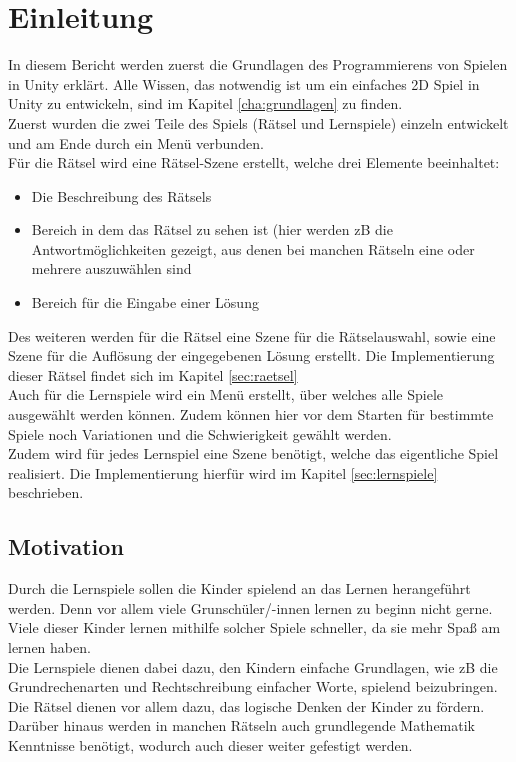 \chapter{Einleitung}
\label{cha:einleitung}

In diesem Bericht werden zuerst die Grundlagen des Programmierens von Spielen in Unity erklärt. Alle Wissen, das notwendig ist um ein einfaches 2D Spiel in Unity zu entwickeln, sind im Kapitel \ref{cha:grundlagen} zu finden.\\
Zuerst wurden die zwei Teile des Spiels (Rätsel und Lernspiele) einzeln entwickelt und am Ende durch ein Menü verbunden.\\
Für die Rätsel wird eine Rätsel-Szene erstellt, welche drei Elemente beeinhaltet:
\begin{itemize}
	\item Die Beschreibung des Rätsels
	\item Bereich in dem das Rätsel zu sehen ist (hier werden zB die Antwortmöglichkeiten gezeigt, aus denen bei manchen Rätseln eine oder mehrere auszuwählen sind %
	\item Bereich für die Eingabe einer Lösung
\end{itemize}
Des weiteren werden für die Rätsel eine Szene für die Rätselauswahl, sowie eine Szene für die Auflösung der eingegebenen Lösung erstellt. Die Implementierung dieser Rätsel findet sich im Kapitel \ref{sec:raetsel}\\

Auch für die Lernspiele wird ein Menü erstellt, über welches alle Spiele ausgewählt werden können. Zudem können hier vor dem Starten für bestimmte Spiele noch Variationen und die Schwierigkeit gewählt werden. \\
Zudem wird für jedes Lernspiel eine Szene benötigt, welche das eigentliche Spiel realisiert. Die Implementierung hierfür wird im Kapitel \ref{sec:lernspiele} beschrieben.\\

\section{Motivation}
\label{sec:motivation}

Durch die Lernspiele sollen die Kinder spielend an das Lernen herangeführt werden. Denn vor allem viele Grunschüler/-innen lernen zu beginn nicht gerne. Viele dieser Kinder lernen mithilfe solcher Spiele schneller, da sie mehr Spaß am lernen haben. \\
Die Lernspiele dienen dabei dazu, den Kindern einfache Grundlagen, wie zB die Grundrechenarten und Rechtschreibung einfacher Worte, spielend beizubringen. Die Rätsel dienen vor allem dazu, das logische Denken der Kinder zu fördern. Darüber hinaus werden in manchen Rätseln auch grundlegende Mathematik Kenntnisse benötigt, wodurch auch dieser weiter gefestigt werden.

